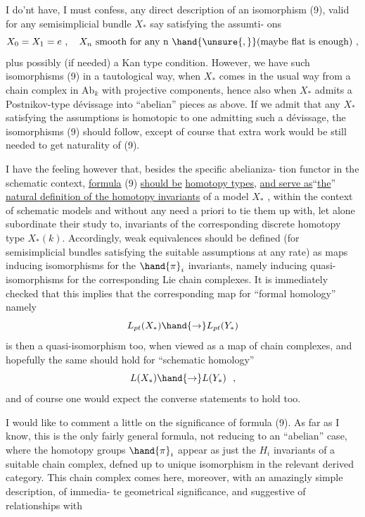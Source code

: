 
I do'nt have,  I must confess,  any direct description of  an isomorphism
(9),  valid for any semisimplicial bundle $X_{*}$  say satisfying the assumti-%
ons
\[ X_0=X_1= e \ , \quad X_n \text{ smooth for any n } \hand{\unsure{,}}\text{(maybe flat is enough) ,} \]
plus possibly (if needed) a Kan type condition.  However,  we have
such isomorphisms (9) in a tautological way,  when $X_{*}$  comes  in the
usual way from a chain complex in Ab$_k$  with projective components,  hence
also when $X_{*}$  admits a Postnikov-type dévissage into ``abelian'' pieces as
above.  If we admit that any $X_{*}$  satisfying the assumptions is homotopic
to one admitting such a dévissage,  the isomorphisms (9) should follow,
except of course that extra work would be still needed to get naturality
of (9).

I have the feeling however that,  besides the specific abelianiza-%
tion functor in the schematic context,  \uline{formula} (9) \uline{should be}  
   \uline{homotopy types},  \uline{and serve as}``\uline{the}''
\uline{natural definition of the homotopy invariants} of a model $X_{*}$ ,  within the
context of schematic models and without any need a priori to 
 tie them up with,  let alone subordinate their study\hand{\unsure{,}} to,  
invariants of  the corresponding discrete homotopy
type $X_{*}(k)$.  Accordingly,   weak equivalences should be defined 
 (for semisimplicial bundles satisfying the suitable assumptions at
any rate)  as maps inducing isomorphisms for the $\hand{\pi}_i$ invariants,  namely
inducing quasi-isomorphisms for the corresponding Lie chain complexes.
It is immediately checked that this implies that the corresponding map
for ``formal homology'' namely
\[ L_{pt}(X_{*}) \hand{\to} L_{pt}(Y_{*}) \]
is then a quasi-isomorphism too,  when viewed as a map of chain complexes,
and hopefully the same should hold for ``schematic homology''
\[ L(X_{*}) \hand{\to} L(Y_{*}) \ \ , \]
and of course one would expect the converse statements to hold too.

I would like to comment a little on the significance of formula (9).
 As far as I know,  this is the only fairly general formula,  not
reducing to an ``abelian'' case,  where the homotopy groups $\hand{\pi}_i$  appear
as just the $H_i$  invariants of a suitable chain complex,  defned up to
unique isomorphism in the relevant derived category.  This chain complex
comes here,  moreover,  with an amazingly simple description,  of immedia-%
te geometrical significance,  and suggestive of  relationships with

